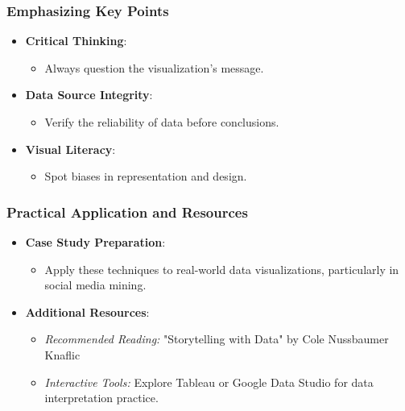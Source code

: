 \documentclass{beamer}
\begin{document}
\begin{frame}[fragile]
    \frametitle{Emphasizing Key Points}
    \begin{itemize}
        \item \textbf{Critical Thinking}:
        \begin{itemize}
            \item Always question the visualization's message.
        \end{itemize}
        
        \item \textbf{Data Source Integrity}:
        \begin{itemize}
            \item Verify the reliability of data before conclusions.
        \end{itemize}
        
        \item \textbf{Visual Literacy}:
        \begin{itemize}
            \item Spot biases in representation and design.
        \end{itemize}
    \end{itemize}
\end{frame}

\begin{frame}[fragile]
    \frametitle{Practical Application and Resources}
    \begin{itemize}
        \item \textbf{Case Study Preparation}:
        \begin{itemize}
            \item Apply these techniques to real-world data visualizations, particularly in social media mining.
        \end{itemize}
        
        \item \textbf{Additional Resources}:
        \begin{itemize}
            \item \textit{Recommended Reading:} "Storytelling with Data" by Cole Nussbaumer Knaflic
            \item \textit{Interactive Tools:} Explore Tableau or Google Data Studio for data interpretation practice.
        \end{itemize}
    \end{itemize}
\end{frame}
\end{document}
